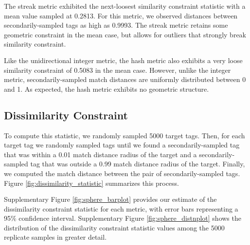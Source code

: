 
The streak metric exhibited the next-loosest similarity constraint statistic with a mean value sampled at 0.2813.
For this metric, we observed distances between secondarily-sampled tags as high as 0.9993.
The streak metric retains some geometric constraint in the mean case, but allows for outliers that strongly break similarity constraint.

Like the unidirectional integer metric, the hash metric also exhibits a very loose similarity constraint of 0.5083 in the mean case.
However, unlike the integer metric, secondarily-sampled match distances are uniformly distributed between 0 and 1.
As expected, the hash metric exhibits no geometric structure.

\subsection{Dissimilarity Constraint} \label{sec:dissimilarityconstraint}


% 

To compute this statistic, we randomly sampled 5000 target tags.
Then, for each target tag we randomly sampled tags until we found a secondarily-sampled tag that was within a 0.01 match distance radius of the target and a secondarily-sampled tag that was outside a 0.99 match distance radius of the target.
Finally, we computed the match distance between the pair of secondarily-sampled tags.
Figure \ref{fig:dissimilarity_statistic} summarizes this process.

Supplementary Figure \ref{fig:sphere_barplot} provides our estimate of the dissimilarity constraint statistic for each metric, with error bars representing a 95\% confidence interval.
Supplementary Figure \ref{fig:sphere_distnplot} shows the distribution of the dissimilarity constraint statistic values among the 5000 replicate samples in greater detail.

